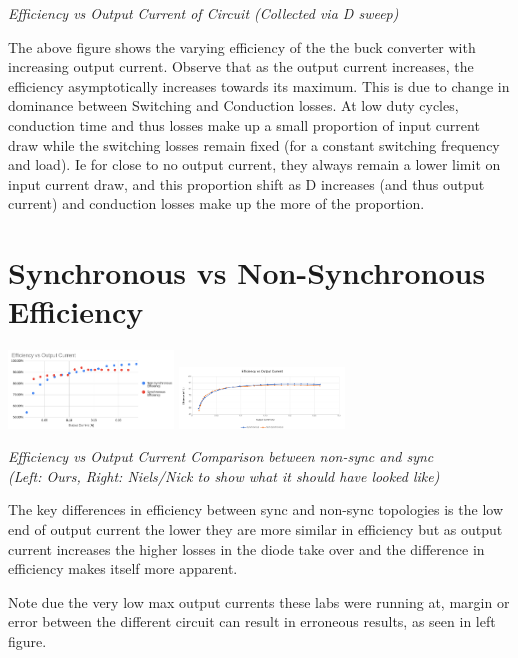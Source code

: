 \documentclass[11pt]{article}
\begin{document}
\begin{preview}
\begin{center}
    \textit{Efficiency vs Output Current of Circuit (Collected via D sweep)}
    \end{center}

    The above figure shows the varying efficiency of the the buck converter with increasing output current. Observe that as the output current increases, the efficiency asymptotically increases towards its maximum. This is due to change in dominance between Switching and Conduction losses. At low duty cycles, conduction time and thus losses make up a small proportion of input current draw while the switching losses remain fixed (for a constant switching frequency and load). Ie for close to no output current, they always remain a lower limit on input current draw, and this proportion shift as D increases (and thus output current) and conduction losses make up the more of the proportion.

    \section{Synchronous vs Non-Synchronous Efficiency}
    \begin{center}
        \includegraphics[width=0.33\textwidth]{img/eff_comp.png}
        \includegraphics[width=0.33\textwidth]{img/sync_vs_non-sync.png}

    \textit{Efficiency vs Output Current Comparison between non-sync and sync \\(Left: Ours, Right: Niels/Nick to show what it should have looked like)}

    The key differences in efficiency between sync and non-sync topologies is the low end of output current the lower they are more similar in efficiency but as output current increases the higher losses in the diode take over and the difference in efficiency makes itself more apparent.
    
    Note due the very low max output currents these labs were running at, margin or error between the different circuit can result in erroneous results, as seen in left figure.


\end{center}
\end{preview}
\end{document}
